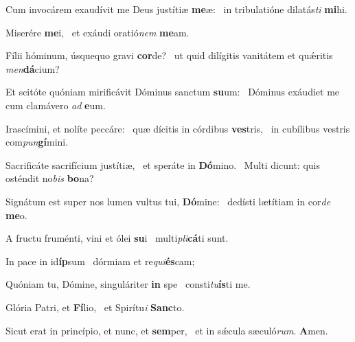 \item Cum invocárem exaudívit me Deus justítiæ \textbf{me}æ:~\psstar{} in tribulatióne dilatás\textit{ti} \textbf{mi}hi.
\item Miserére \textbf{me}i,~\psstar{} et exáudi oratió\textit{nem} \textbf{me}am.
\item Fílii hóminum, úsquequo gravi \textbf{cor}de?~\psstar{} ut quid dilígitis vanitátem et quǽritis \textit{men}\textbf{dá}cium?
\item Et scitóte quóniam mirificávit Dóminus sanctum \textbf{su}um:~\psstar{} Dóminus exáudiet me cum clamávero \textit{ad} \textbf{e}um.
\item Irascímini, et nolíte peccáre:~\pscross{} quæ dícitis in córdibus \textbf{ves}tris,~\psstar{} in cubílibus vestris com\textit{pun}\textbf{gí}mini.
\item Sacrificáte sacrifícium justítiæ,~\pscross{} et speráte in \textbf{Dó}mino.~\psstar{} Multi dicunt: quis osténdit no\textit{bis} \textbf{bo}na?
\item Signátum est super nos lumen vultus tui, \textbf{Dó}mine:~\psstar{} dedísti lætítiam in cor\textit{de} \textbf{me}o.
\item A fructu fruménti, vini et ólei \textbf{su}i~\psstar{} multi\textit{pli}\textbf{cá}ti sunt.
\item In pace in id\textbf{íp}sum~\psstar{} dórmiam et re\textit{qui}\textbf{és}cam;
\item Quóniam tu, Dómine, singuláriter \textbf{in} spe~\psstar{} consti\textit{tu}\textbf{ís}ti me.
\item Glória Patri, et \textbf{Fí}lio,~\psstar{} et Spirítu\textit{i} \textbf{Sanc}to.
\item Sicut erat in princípio, et nunc, et \textbf{sem}per,~\psstar{} et in sǽcula sæculó\textit{rum}. \textbf{A}men.